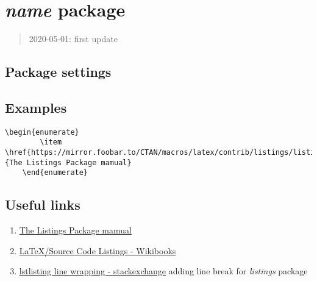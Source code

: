 \section{\textit{name} package}

\begin{quote}
    2020-05-01: first update
\end{quote}


\subsection{Package settings}


\subsection{Examples}

\begin{lstlisting}[language=Tex]
    \begin{enumerate}
        \item \href{https://mirror.foobar.to/CTAN/macros/latex/contrib/listings/listings.pdf}{The Listings Package mamual}
    \end{enumerate}
\end{lstlisting}



\subsection{Useful links}

\begin{enumerate}

    \item \href{https://mirror.foobar.to/CTAN/macros/latex/contrib/listings/listings.pdf}{The Listings Package mamual}
    \item \href{https://en.wikibooks.org/wiki/LaTeX/Source_Code_Listings}{LaTeX/Source Code Listings - Wikibooks}
    \item \href{https://tex.stackexchange.com/questions/116534/lstlisting-line-wrapping/116572}{lstlisting line wrapping - stackexchange}
        adding line break for \textit{listings} package
    
\end{enumerate}
